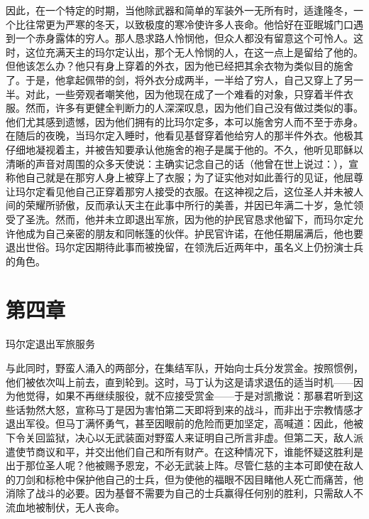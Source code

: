 因此，在一个特定的时期，当他除武器和简单的军装外一无所有时，适逢隆冬，一个比往常更为严寒的冬天，以致极度的寒冷使许多人丧命。他恰好在亚眠城门口遇到一个赤身露体的穷人。那人恳求路人怜悯他，但众人都没有留意这个可怜人。这时，这位充满天主的玛尔定认出，那个无人怜悯的人，在这一点上是留给了他的。但他该怎么办？他只有身上穿着的外衣，因为他已经把其余衣物为类似目的施舍了。于是，他拿起佩带的剑，将外衣分成两半，一半给了穷人，自己又穿上了另一半。对此，一些旁观者嘲笑他，因为他现在成了一个难看的对象，只穿着半件衣服。然而，许多有更健全判断力的人深深叹息，因为他们自己没有做过类似的事。他们尤其感到遗憾，因为他们拥有的比玛尔定多，本可以施舍穷人而不至于赤身。在随后的夜晚，当玛尔定入睡时，他看见基督穿着他给穷人的那半件外衣。他极其仔细地凝视着主，并被告知要承认他施舍的袍子是属于他的。不久，他听见耶稣以清晰的声音对周围的众多天使说：主确实记念自己的话（他曾在世上说过：），宣称他自己就是在那穷人身上被穿上了衣服；为了证实他对如此善行的见证，他屈尊让玛尔定看见他自己正穿着那穷人接受的衣服。在这神视之后，这位圣人并未被人间的荣耀所骄傲，反而承认天主在此事中所行的美善，并因已年满二十岁，急忙领受了圣洗。然而，他并未立即退出军旅，因为他的护民官恳求他留下，而玛尔定允许他成为自己亲密的朋友和同帐篷的伙伴。护民官许诺，在他任期届满后，他也要退出世俗。玛尔定因期待此事而被挽留，在领洗后近两年中，虽名义上仍扮演士兵的角色。\par


\section{第四章}

玛尔定退出军旅服务\par

与此同时，野蛮人涌入的两部分，在集结军队，开始向士兵分发赏金。按照惯例，他们被依次叫上前去，直到轮到。这时，马丁认为这是请求退伍的适当时机——因为他觉得，如果不再继续服役，就不应接受赏金——于是对凯撒说：那暴君听到这些话勃然大怒，宣称马丁是因为害怕第二天即将到来的战斗，而非出于宗教情感才退出军役。但马丁满怀勇气，甚至因眼前的危险而更加坚定，高喊道：因此，他被下令关回监狱，决心以无武装面对野蛮人来证明自己所言非虚。但第二天，敌人派遣使节商议和平，并交出他们自己和所有财产。在这种情况下，谁能怀疑这胜利是出于那位圣人呢？他被赐予恩宠，不必无武装上阵。尽管仁慈的主本可即使在敌人的刀剑和标枪中保护他自己的士兵，但为使他的福眼不因目睹他人死亡而痛苦，他消除了战斗的必要。因为基督不需要为自己的士兵赢得任何别的胜利，只需敌人不流血地被制伏，无人丧命。\par

